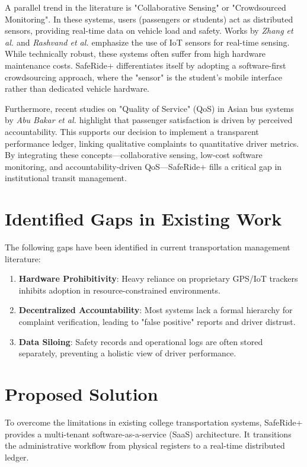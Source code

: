 \documentclass[conference]{IEEEtran}
\begin{document}
A parallel trend in the literature is "Collaborative Sensing" or "Crowdsourced Monitoring". In these systems, users (passengers or students) act as distributed sensors, providing real-time data on vehicle load and safety. Works by \textit{Zhang et al. \cite{b6}} and \textit{Rashvand et al. \cite{b7}} emphasize the use of IoT sensors for real-time sensing. While technically robust, these systems often suffer from high hardware maintenance costs. SafeRide+ differentiates itself by adopting a software-first crowdsourcing approach, where the "sensor" is the student’s mobile interface rather than dedicated vehicle hardware.

Furthermore, recent studies on "Quality of Service" (QoS) in Asian bus systems by \textit{Abu Bakar et al. \cite{b4}} highlight that passenger satisfaction is driven by perceived accountability. This supports our decision to implement a transparent performance ledger, linking qualitative complaints to quantitative driver metrics. By integrating these concepts—collaborative sensing, low-cost software monitoring, and accountability-driven QoS—SafeRide+ fills a critical gap in institutional transit management.

\section{Identified Gaps in Existing Work}
The following gaps have been identified in current transportation management literature:
\begin{enumerate}
    \item \textbf{Hardware Prohibitivity}: Heavy reliance on proprietary GPS/IoT trackers \cite{b6} inhibits adoption in resource-constrained environments.
    \item \textbf{Decentralized Accountability}: Most systems lack a formal hierarchy for complaint verification, leading to "false positive" reports and driver distrust.
    \item \textbf{Data Siloing}: Safety records and operational logs are often stored separately, preventing a holistic view of driver performance.
\end{enumerate}

\section{Proposed Solution}

To overcome the limitations in existing college transportation systems, SafeRide+ provides a multi-tenant software-as-a-service (SaaS) architecture. It transitions the administrative workflow from physical registers to a real-time distributed ledger.
\end{document}
